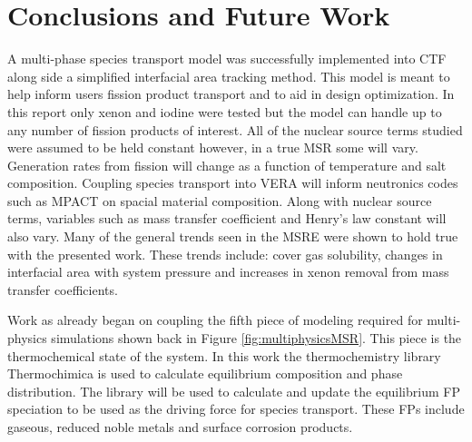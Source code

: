 \chapter{Conclusions and Future Work}
A multi-phase species transport model was successfully implemented into CTF along side a simplified interfacial area tracking method. This model is meant to help inform users fission product transport and to aid in design optimization. In this report only xenon and iodine were tested but the model can handle up to any number of fission products of interest. All of the nuclear source terms studied were assumed to be held constant however, in a true MSR some will vary. Generation rates from fission will change as a function of temperature and salt composition. Coupling species transport into VERA will inform neutronics codes such as MPACT on spacial material composition. Along with nuclear source terms, variables such as mass transfer coefficient and Henry's law constant will also vary. Many of the general trends seen in the MSRE were shown to hold true with the presented work. These trends include: cover gas solubility, changes in interfacial area with system pressure and increases in xenon removal from mass transfer coefficients. 

Work as already began on coupling the fifth piece of modeling required for multi-physics simulations shown back in Figure \ref{fig:multiphysicsMSR}. This piece is the thermochemical state of the system. In this work the thermochemistry library Thermochimica \cite{piro2013} is used to calculate equilibrium composition and phase distribution. The library will be used to calculate and update the equilibrium FP speciation to be used as the driving force for species transport. These FPs include gaseous, reduced noble metals and surface corrosion products. 